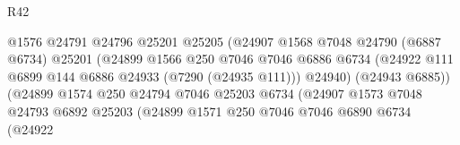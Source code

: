\begin{lexlean}{R42}
\begin{coremodule}
{                                            @1576
                                            @24791
                                            @24796
                                            @25201
                                            @25205
                                            (@24907
                                              @1568
                                              @7048
                                              @24790
                                              (@6887 @6734)
                                              @25201
                                              (@24899
                                                @1566
                                                @250
                                                @7046
                                                @7046
                                                @6886
                                                @6734
                                                (@24922
                                                  @111
                                                  @6899
                                                  @144
                                                  @6886
                                                  @24933
                                                  (@7290 (@24935 @111)))
                                                @24940)
                                              (@24943 @6885))
                                            (@24899
                                              @1574
                                              @250
                                              @24794
                                              @7046
                                              @25203
                                              @6734
                                              (@24907
                                                @1573
                                                @7048
                                                @24793
                                                @6892
                                                @25203
                                                (@24899
                                                  @1571
                                                  @250
                                                  @7046
                                                  @7046
                                                  @6890
                                                  @6734
                                                  (@24922
}
\end{coremodule}
\end{lexlean}
